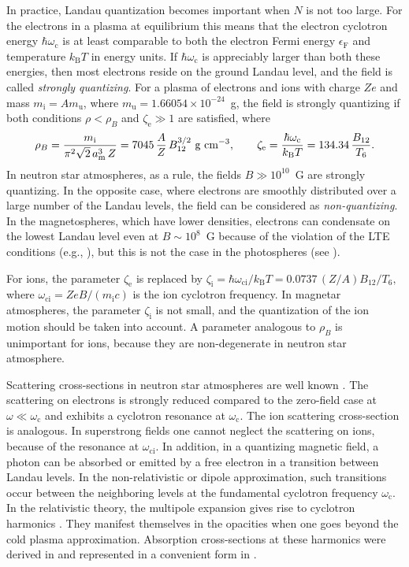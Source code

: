\documentclass{pos1}
\newcommand{\am}{a_\mathrm{m}}
\newcommand{\EF}{\epsilon_\mathrm{F}}
\newcommand{\gcc}{\mbox{g~cm$^{-3}$}}
\newcommand{\kB}{k_\mathrm{B}}
\newcommand{\mion}{m_\mathrm{i}}
\newcommand{\omc}{\omega_\mathrm{c}}
\newcommand{\omci}{\omega_\mathrm{ci}}
\newcommand{\zete}{\zeta_\mathrm{e}}
\newcommand{\zeti}{\zeta_\mathrm{i}}
\begin{document}
In practice, Landau quantization becomes important when $N$ is not too
large. For the electrons in a plasma at equilibrium this means that
the electron cyclotron energy $\hbar\omc$ is at least comparable to
both the electron Fermi energy $\EF$ and temperature $\kB T$ in energy
units.  If $\hbar\omc$ is appreciably larger than both these energies,
then most electrons reside on the ground Landau level, and the field
is called \emph{strongly quantizing}. 
For a plasma of electrons and ions with charge $Ze$ and mass
$\mion=Am_\mathrm{u}$, where $m_\mathrm{u}=1.66054\times10^{-24}$~g,
the field is strongly quantizing if both conditions 
$\rho<\rho_B$ and $\zete\gg1$ are satisfied, where
\begin{equation}
  \rho_B =
 \frac{\mion}{\pi^2\sqrt2\,\am^3\,Z}
  = 7045 \,\frac{A}{Z}
       \,B_{12}^{3/2}\textrm{ \gcc},
\qquad
   \zete = \frac{\hbar\omc}{\kB T} = 134.34\,
   \frac{B_{12}}{T_6} .
\label{zeta_e}
\end{equation}
In neutron star atmospheres, as a rule,
the fields  $B\gg10^{10}$~G are strongly quantizing.
In the opposite case, where electrons are smoothly distributed over a
large number of the Landau levels, the field can be considered as
\emph{non-quantizing}. In the magnetospheres, which have lower
densities, electrons can condensate on the lowest Landau level even at
$B\sim10^8$~G because of the violation of the LTE conditions (e.g.,
\cite{Mesz}), but this is not the case in the photospheres (see
\cite{P14}).

For ions, the
parameter $\zete$ is replaced by 
$
   \zeti = \hbar\omci/\kB T = 0.0737\,(Z/A)
           B_{12}/T_6,
$
where $\omci=ZeB/(\mion c)$ is the ion cyclotron frequency.
In magnetar atmospheres, the parameter $\zeti$ is not small,
and the quantization of the ion motion should be
taken into account. A parameter analogous to $\rho_B$ is
unimportant for ions, because they are non-degenerate in
neutron star atmosphere.

Scattering cross-sections in neutron star atmospheres are well known
\cite{Ventura79,KaminkerPS82,Mesz}. The scattering on electrons is
strongly reduced compared to the zero-field case at $\omega\ll\omc$
and exhibits a cyclotron resonance at $\omc$. The ion scattering 
cross-section is analogous. In superstrong fields one cannot neglect the
scattering on ions, because of the resonance at $\omci$. In addition,
in  a quantizing magnetic field, a photon can be absorbed or emitted
by a free electron in a transition between Landau levels. In the
non-relativistic or dipole approximation, such transitions occur
between the neighboring levels at the fundamental cyclotron frequency
$\omc$. In the relativistic theory, the multipole expansion gives rise
to cyclotron harmonics \cite{Zheleznyakov}. They manifest themselves
in the opacities when one goes beyond the cold plasma approximation.
Absorption cross-sections at these harmonics were derived in
\cite{PavlovSY80} and represented in a convenient form in
\cite{SuleimanovPW12}. 
\end{document}
